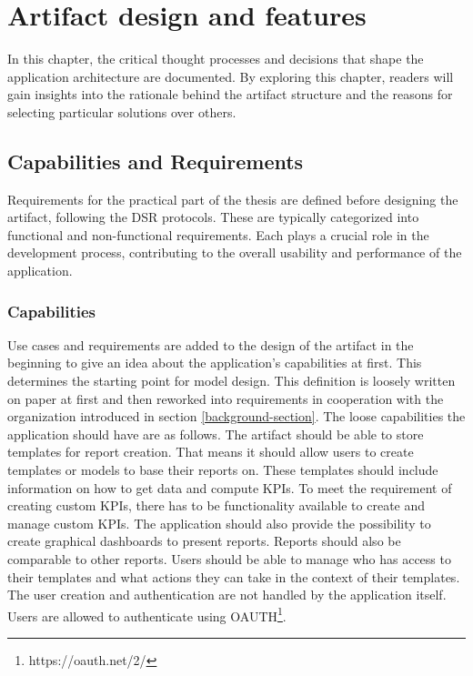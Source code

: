 \chapter{Artifact design and features}
\label{Chapter5} 

In this chapter, the critical thought processes and decisions 
that shape the application architecture are documented. 
By exploring this chapter, readers will gain insights into the rationale behind the artifact structure and the reasons for selecting particular solutions over others.

\section{Capabilities and Requirements} 
\label{Requirements}

Requirements for the practical part of the thesis are defined before designing the artifact, following the DSR protocols. 
These are typically categorized into functional and non-functional requirements. 
Each plays a crucial role in the development process, 
contributing to the overall usability and performance of the application.

\subsection{Capabilities}

Use cases and requirements are added to the design of the 
artifact in the beginning to give an idea about the application's capabilities at first. 
This determines the starting point for model design. 
This definition is loosely written on paper at first and then reworked into 
requirements in cooperation with the organization introduced in section \ref{background-section}. 
The loose capabilities the application should have are as follows.
The artifact should be able to store templates for report creation. 
That means it should allow users to create templates or models to base their reports on. 
These templates should include information on how to get data and compute KPIs. 
To meet the requirement of creating custom KPIs, there has to be functionality available to create and manage custom KPIs.
The application should also provide the possibility to create graphical dashboards to 
present reports. 
Reports should also be comparable to other reports. 
Users should be able to manage who has access to their templates 
and what actions they can take in the context of their templates. 
The user creation and authentication are not handled by the application itself. 
Users are allowed to authenticate using OAUTH\footnote{https://oauth.net/2/}.

